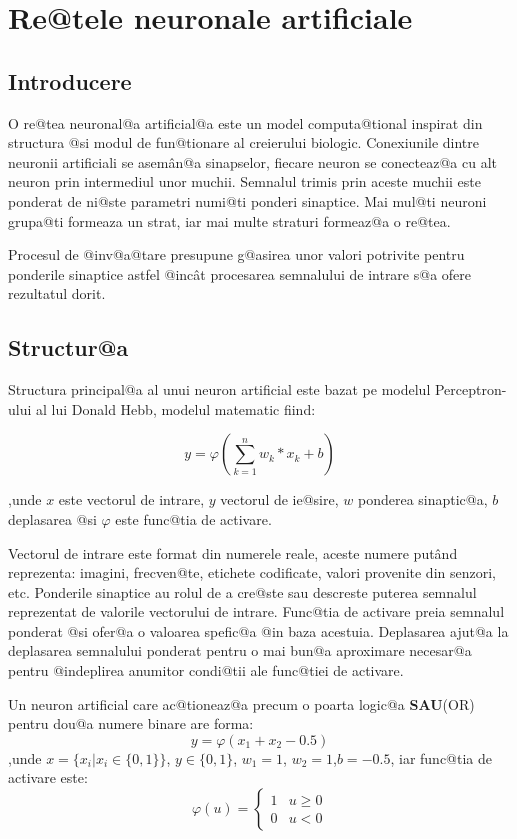 	

\chapter{Re@tele neuronale artificiale}


\section{Introducere}

O re@tea neuronal@a artificial@a este un model computa@tional inspirat din structura @si modul de fun@tionare al creierului biologic. Conexiunile dintre neuronii artificiali se asem\^ an@a sinapselor, fiecare neuron se conecteaz@a cu alt neuron prin intermediul unor muchii. Semnalul trimis prin aceste muchii este ponderat de ni@ste parametri numi@ti ponderi sinaptice. Mai mul@ti neuroni grupa@ti formeaza un strat, iar mai multe straturi formeaz@a o re@tea.

Procesul de @inv@a@tare presupune g@asirea unor valori potrivite pentru ponderile sinaptice astfel @inc\^ at procesarea semnalului de intrare s@a ofere rezultatul dorit.


\section{Structur@a}

Structura principal@a al unui neuron artificial este bazat pe modelul Perceptron-ului al lui Donald Hebb, modelul matematic fiind:

$$
	y = \varphi \left( \sum_{k=1}^{n} w_k * x_k + b \right)
$$

,unde $x$ este vectorul de intrare, $y$ vectorul de ie@sire, $w$ ponderea sinaptic@a, $b$ deplasarea @si $\varphi$ este func@tia de activare.

Vectorul de intrare este format din numerele reale, aceste numere put\^ and reprezenta: imagini, frecven@te, etichete codificate, valori provenite din senzori, etc. Ponderile sinaptice au rolul de a cre@ste sau descreste puterea semnalul reprezentat de valorile vectorului de intrare. Func@tia de activare preia semnalul ponderat @si ofer@a o valoarea spefic@a @in baza acestuia. Deplasarea ajut@a la deplasarea semnalului ponderat pentru o mai bun@a aproximare necesar@a pentru @indeplirea anumitor condi@tii ale func@tiei de activare.

\begin{exemplu}

	Un neuron artificial care ac@tioneaz@a precum o poarta logic@a {\bf SAU}(OR) pentru dou@a numere binare are forma:
$$
	y = \varphi ( x_1 + x_2 - 0.5 )
$$
,unde $x = \{ x_i | x_i \in \{0, 1\} \}$, $y \in \{0, 1\}$, $w_1 = 1$, $w_2 = 1$,$b = -0.5$, iar func@tia de activare este: 
$$
	\varphi ( u ) = \left\lbrace
		\begin{array}{lc}
			1 & u \geq 0 \\
			0 & u < 0
		\end{array}
	\right.
$$
\end{exemplu}

